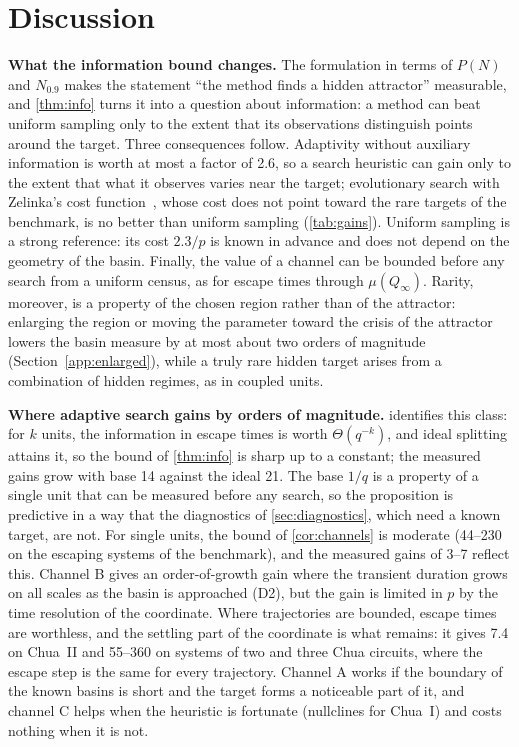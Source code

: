 \section{Discussion}\label{sec:discussion}

\textbf{What the information bound changes.} The formulation in terms of $P(N)$ and $N_{0.9}$ makes the statement ``the method finds a hidden attractor'' measurable, and \cref{thm:info} turns it into a question about information: a method can beat uniform sampling only to the extent that its observations distinguish points around the target. Three consequences follow. Adaptivity without auxiliary information is worth at most a factor of 2.6, so a search heuristic can gain only to the extent that what it observes varies near the target; evolutionary search with Zelinka's cost function~\cite{Zelinka2016}, whose cost does not point toward the rare targets of the benchmark, is no better than uniform sampling (\cref{tab:gains}). Uniform sampling is a strong reference: its cost $2.3/p$ is known in advance and does not depend on the geometry of the basin. Finally, the value of a channel can be bounded before any search from a uniform census, as for escape times through $\mu(Q_\infty)$. Rarity, moreover, is a property of the chosen region rather than of the attractor: enlarging the region or moving the parameter toward the crisis of the attractor lowers the basin measure by at most about two orders of magnitude (Section~\ref{app:enlarged}), while a truly rare hidden target arises from a combination of hidden regimes, as in coupled units.

\textbf{Where adaptive search gains by orders of magnitude.}  identifies this class: for $k$ units, the information in escape times is worth $\Theta(q^{-k})$, and ideal splitting attains it, so the bound of \cref{thm:info} is sharp up to a constant; the measured gains grow with base 14 against the ideal 21. The base $1/q$ is a property of a single unit that can be measured before any search, so the proposition is predictive in a way that the diagnostics of \cref{sec:diagnostics}, which need a known target, are not. For single units, the bound of \cref{cor:channels} is moderate (44--230 on the escaping systems of the benchmark), and the measured gains of 3--7 reflect this. Channel B gives an order-of-growth gain where the transient duration grows on all scales as the basin is approached (D2), but the gain is limited in $p$ by the time resolution of the coordinate. Where trajectories are bounded, escape times are worthless, and the settling part of the coordinate is what remains: it gives 7.4 on Chua~II and 55--360 on systems of two and three Chua circuits, where the escape step is the same for every trajectory. Channel A works if the boundary of the known basins is short and the target forms a noticeable part of it, and channel C helps when the heuristic is fortunate (nullclines for Chua~I) and costs nothing when it is not.

